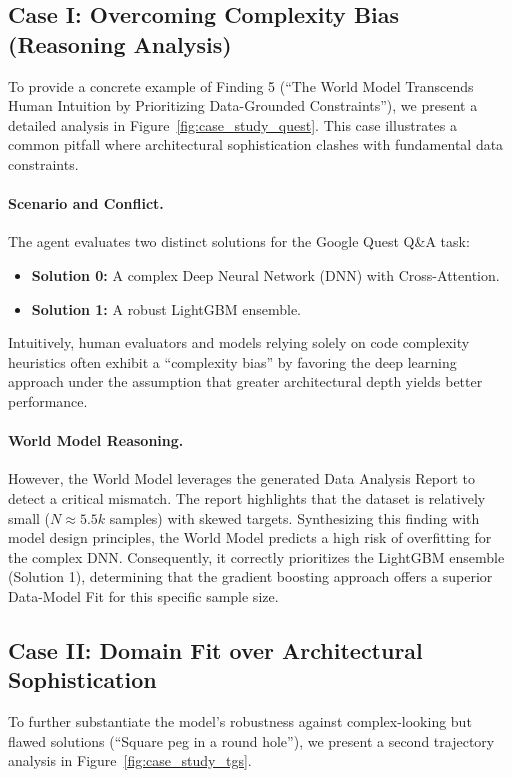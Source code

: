 \subsection{Case I: Overcoming Complexity Bias (Reasoning Analysis)}
\label{app:case_bias}

To provide a concrete example of Finding 5 (``The World Model Transcends Human Intuition by Prioritizing Data-Grounded Constraints''), we present a detailed analysis in Figure~\ref{fig:case_study_quest}.
This case illustrates a common pitfall where architectural sophistication clashes with fundamental data constraints.

\paragraph{Scenario and Conflict.}
The agent evaluates two distinct solutions for the Google Quest Q\&A task:
\begin{itemize}
    \item \textbf{Solution 0:} A complex Deep Neural Network (DNN) with Cross-Attention.
    \item \textbf{Solution 1:} A robust LightGBM ensemble.
\end{itemize}
Intuitively, human evaluators and models relying solely on code complexity heuristics often exhibit a ``complexity bias'' by favoring the deep learning approach under the assumption that greater architectural depth yields better performance.

\paragraph{World Model Reasoning.}
However, the World Model leverages the generated Data Analysis Report to detect a critical mismatch.
The report highlights that the dataset is relatively small ($N \approx 5.5k$ samples) with skewed targets.
Synthesizing this finding with model design principles, the World Model predicts a high risk of overfitting for the complex DNN.
Consequently, it correctly prioritizes the LightGBM ensemble (Solution 1), determining that the gradient boosting approach offers a superior Data-Model Fit for this specific sample size.

\subsection{Case II: Domain Fit over Architectural Sophistication}
\label{app:case_domain}

To further substantiate the model's robustness against complex-looking but flawed solutions (``Square peg in a round hole''), we present a second trajectory analysis in Figure~\ref{fig:case_study_tgs}.

